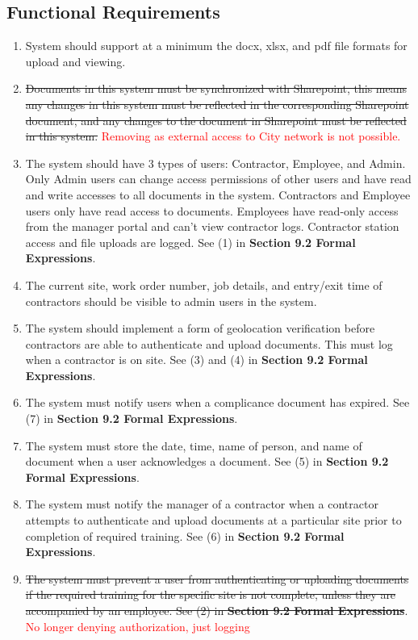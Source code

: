 \documentclass[12pt]{article}
\begin{document}
\subsection{Functional Requirements}
\begin{enumerate} [{FR}1.]
  \item System should support at a minimum the docx, xlsx, and pdf
    file formats for upload and viewing.
  \item \sout{Documents in this system must be synchronized with
      Sharepoint, this means any changes in this system must be
      reflected in the corresponding Sharepoint document, and any
    changes to the document in Sharepoint must be reflected in this system.}
    \textcolor{red}{Removing as external access to City network is
    not possible.}
  \item The system should have 3 types of users: Contractor,
    Employee, and Admin.
    Only Admin users can change
    access permissions of other users and have read and write
    accesses to all documents in the system. Contractors and Employee
    users only have read access to documents. Employees have
    read-only access from the manager portal
    and can't view contractor logs. Contractor station access and
    file uploads are logged.
    See (1) in \textbf{Section 9.2 Formal Expressions}.
  \item The current site, work order number, job details, and entry/exit time of
    contractors should be visible to admin users in the system.
  \item The system should implement a form of geolocation verification before
    contractors are able to authenticate and upload documents. This
    must log when a contractor is on site. See (3) and
    (4) in \textbf{Section 9.2 Formal Expressions}.
  \item The system must notify users when a complicance document has expired.
    See (7) in \textbf{Section 9.2 Formal Expressions}.
  \item The system must store the date, time, name of person, and name of
    document when a user acknowledges a document. See (5) in
    \textbf{Section 9.2 Formal Expressions}.
  \item The system must notify the manager of a contractor when a contractor
    attempts to authenticate and upload documents at a particular site prior to
    completion of required training. See (6) in
    \textbf{Section 9.2 Formal Expressions}.
  \item \sout{The system must prevent a user from authenticating or uploading
      documents if the required training for the specific site is not
      complete, unless they are accompanied by an employee.
    See (2) in \textbf{Section 9.2 Formal Expressions}}.
    \textcolor{red}{No longer denying authorization, just logging}

\end{enumerate}
\end{document}
